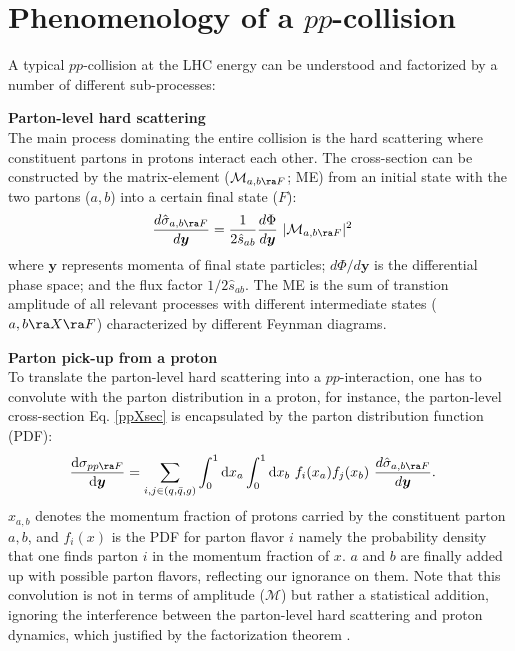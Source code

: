 \section{Phenomenology of a $pp$-collision}
A typical $pp$-collision at the LHC energy can be understood and factorized by a number of different sub-processes:
\begin{description}

\item \textbf{Parton-level hard scattering} \mbox{} \\
The main process dominating the entire collision is the hard scattering where constituent partons in protons interact each other.  
The cross-section can be constructed by the matrix-element ($\mathcal{M}_{a,b\ra F}$; ME) from an initial state with the two partons ($a, b$) into a certain final state ($F$): 
\begin{align}
\frac{d\hat{\sigma}_{a,b \ra F}}{d\bm{y}} & = \frac{1}{2 \hat{s}_{ab}} \frac{d\Phi}{d\bm{y}} \,\, |\mathcal{M}_{a,b \ra F}|^2  
\label{ppXsec}
\end{align}
where $\bm{y}$ represents momenta of final state particles; $d\Phi/d\bm{y}$ is the differential phase space; and the flux factor $1/2\hat{s}_{ab}$. 
The ME is the sum of transtion amplitude of all relevant processes with different intermediate states ($a,b \ra X \ra F$) characterized by different Feynman diagrams. \\


\item \textbf{Parton pick-up from a proton} \mbox{} \\
To translate the parton-level hard scattering into a $pp$-interaction,
one has to convolute with the parton distribution in a proton, for instance,
the parton-level cross-section Eq. \ref{ppXsec} is encapsulated by the parton distribution function (PDF):
\begin{align}
\frac{\mathrm{d}\sigma_{pp\ra F}}{\mathrm{d}\bm{y}} & = \sum_{i,j\in (q,\bar{q},g)} \int_0^1 \mathrm{d}x_a \int_0^1 \mathrm{d}x_b \,\, f_i (x_a) f_j (x_b) \,\, \frac{d\hat{\sigma}_{a,b \ra F}}{d\bm{y}}.
\label{ppXsecWithPDF}
\end{align}
$x_{a,b}$ denotes the momentum fraction of protons carried by the constituent parton $a,b$, and $f_i(x)$ is the PDF for parton flavor $i$ namely the probability density that one finds parton $i$ in the momentum fraction of $x$. $a$ and $b$ are finally added up with possible parton flavors, reflecting our ignorance on them.
Note that this convolution is not in terms of amplitude ($\mathcal{M}$) but rather a statistical addition,
ignoring the interference between the parton-level hard scattering and proton dynamics, which justified by the factorization theorem \cite{factTheoremQCD}. \\



\end{description}
